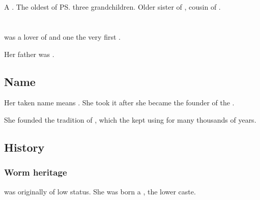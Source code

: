 \section{\Thiencaste}
\index{\Thiencaste}
A \dragon. 
The oldest of \ps{\QuessanthIshnaruchaefir} three grandchildren. 
Older sister of \Tentocoth, cousin of \Rathyon. 















\section[Tyarith Xzai-Rasshana]{\TyarithXserasshana}
\index{\TyarithXserasshana}
\TyarithXserasshana{} was a lover of \Sethicus and one the very first \dragons. 

Her father was . 







\subsection{Name}
Her taken name \quo{\Kserasshana} means . 
She took it after she became the founder of the \dzraicchenosses. 

She founded the tradition of , which the \dragons{} kept using for many thousands of years. 






\subsection{History}





\subsubsection{Worm heritage}
\Tiamat was originally of low status. 
She was born a , the \Caisith lower caste.





